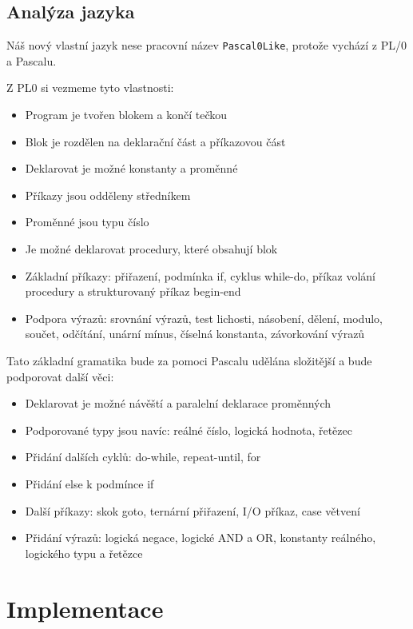 \documentclass[
12pt,
a4paper,
pdftex,
czech,
titlepage
]{report}
\begin{document}
\section{Analýza jazyka}

Náš nový vlastní jazyk nese pracovní název \texttt{Pascal0Like}, protože vychází z PL/0 a Pascalu.

Z PL0 si vezmeme tyto vlastnosti:
\begin{itemize}
\item Program je tvořen blokem a končí tečkou
\item Blok je rozdělen na deklarační část a příkazovou část
\item Deklarovat je možné konstanty a proměnné
\item Příkazy jsou odděleny středníkem
\item Proměnné jsou typu číslo
\item Je možné deklarovat procedury, které obsahují blok
\item Základní příkazy: přiřazení, podmínka if, cyklus while-do, příkaz volání procedury a strukturovaný příkaz begin-end
\item Podpora výrazů: srovnání výrazů, test lichosti, násobení, dělení, modulo, součet, odčítání, unární mínus, číselná konstanta, závorkování výrazů
\end{itemize}

Tato základní gramatika bude za pomoci Pascalu udělána složitější a bude podporovat další věci:

\begin{itemize}
\item Deklarovat je možné návěští a paralelní deklarace proměnných
\item Podporované typy jsou navíc: reálné číslo, logická hodnota, řetězec
\item Přidání dalších cyklů: do-while, repeat-until, for
\item Přidání else k podmínce if
\item Další příkazy: skok goto, ternární přiřazení, I/O příkaz, case větvení
\item Přidání výrazů: logická negace, logické AND a OR, konstanty reálného, logického typu a řetězce
\end{itemize}



\chapter{Implementace}
 
\end{document}
